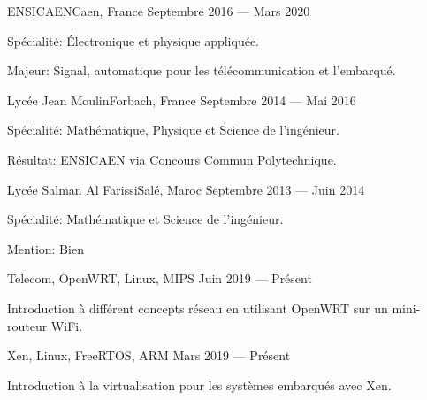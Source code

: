 \documentclass{faresume}
\begin{document}
\begin{column}[\leftcolumnwidth]

            {ENSICAEN}{Caen, France}
            {Septembre 2016 --- Mars 2020}
            {%
                \begin{additems}
                    \item Spécialité: Électronique et physique appliquée.
                    \item Majeur: Signal, automatique pour les télécommunication et l'embarqué.
                \end{additems}
            }

            {Lycée Jean Moulin}{Forbach, France}
            {Septembre 2014 --- Mai 2016}
            {%
                \begin{additems}
                    \item Spécialité: Mathématique, Physique et Science de l'ingénieur.
                    \item Résultat: ENSICAEN via Concours Commun Polytechnique.
                \end{additems}
            }

            {Lycée Salman Al Farissi}{Salé, Maroc}
            {Septembre 2013 --- Juin 2014}
            {%
                \begin{additems}
                    \item Spécialité: Mathématique et Science de l'ingénieur.
                    \item Mention: Bien
                \end{additems}
            }


            {}{Telecom, OpenWRT, Linux, MIPS}
            {Juin 2019 --- Présent}
            {%
                \begin{additems}
                    \item Introduction à différent concepts réseau en utilisant OpenWRT sur un mini-routeur WiFi.
                \end{additems}
            }

            {}{Xen, Linux, FreeRTOS, ARM}
            {Mars 2019 --- Présent}
            {%
                \begin{additems}
                    \item Introduction à la virtualisation pour les systèmes embarqués avec Xen.
                \end{additems}
            }


\end{column}
\end{document}
